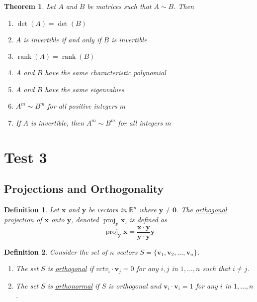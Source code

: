 \documentclass{article}
\theoremstyle{definitionstyle}
\newtheorem{definition}{Definition}[section]
\newtheorem{theorem}{Theorem}[section]
\DeclareMathOperator{\proj}{proj}
\newcommand{\vct}{\mathbf}
\newcommand{\vctproj}[2][]{\proj_{\vct{#1}}\vct{#2}}
\begin{document}
\begin{theorem}
    Let $A$ and $B$ be matrices such that $A \sim B$. Then
    \begin{enumerate}
        \item $\det(A)=\det(B)$
        \item $A$ is invertible if and only if $B$ is invertible
        \item $\operatorname*{rank}(A)=\operatorname*{rank}(B)$
        \item $A$ and $B$ have the same characteristic polynomial
        \item $A$ and $B$ have the same eigenvalues
        \item $A^m \sim B^m$ for all positive integers $m$
        \item If $A$ is invertible, then $A^m \sim B^m$ for all integers $m$
    \end{enumerate}
\end{theorem}

\section*{Test 3}

\subsection{Projections and Orthogonality}

\begin{definition}
    Let $\mathbf{x}$ and $\mathbf{y}$ be vectors in $\mathbb{R}^n$ where $\mathbf{y} \ne \mathbf{0}$. The
    \underline{orthogonal projection} of $\mathbf{x}$ onto $\mathbf{y}$, denoted $\vctproj[y]{x}$, is defined as
    \begin{equation*}
        \vctproj[y]{x}=\frac{\vct x \cdot \vct y}{\vct y \cdot \vct y}\vct y
    \end{equation*}
\end{definition}

\begin{definition}
    Consider the set of $n$ vectors $S=\{\vct{v}_1,\vct{v}_2,\dots,\vct{v}_n\}$.
    \begin{enumerate}
        \item The set $S$ is \underline{orthogonal} if $vct{v}_i \cdot \vct{v}_j = 0$ for any $i, j$ in $1,\dots,n$ such that $i \ne j$.
        \item The set $S$ is \underline{orthonormal} if $S$ is orthogonal \textit{and} $\vct{v}_i \cdot \vct{v}_i = 1$ for any $i$ in $1,\dots,n$.
    \end{enumerate}
\end{definition}
\end{document}
